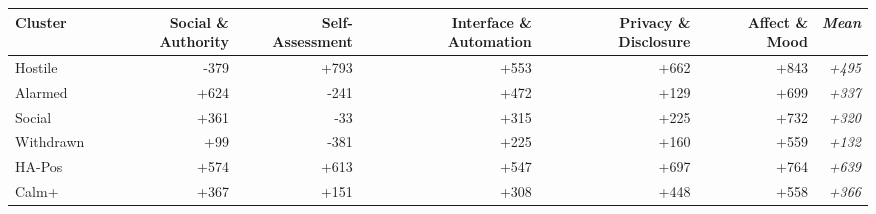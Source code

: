{\renewcommand{\tabcolsep}{10pt}
\begin{tabular}{lrrrrrr}
\toprule
Cluster & Social \& Authority & Self-Assessment & Interface \& Automation & Privacy \& Disclosure & Affect \& Mood & \textit{Mean} \\
\midrule
Hostile & -379 & +793 & +553 & +662 & +843 & \textit{+495} \\
Alarmed & +624 & -241 & +472 & +129 & +699 & \textit{+337} \\
Social & +361 & -33 & +315 & +225 & +732 & \textit{+320} \\
Withdrawn & +99 & -381 & +225 & +160 & +559 & \textit{+132} \\
HA-Pos & +574 & +613 & +547 & +697 & +764 & \textit{+639} \\
Calm+ & +367 & +151 & +308 & +448 & +558 & \textit{+366} \\
\bottomrule
\end{tabular}
}
